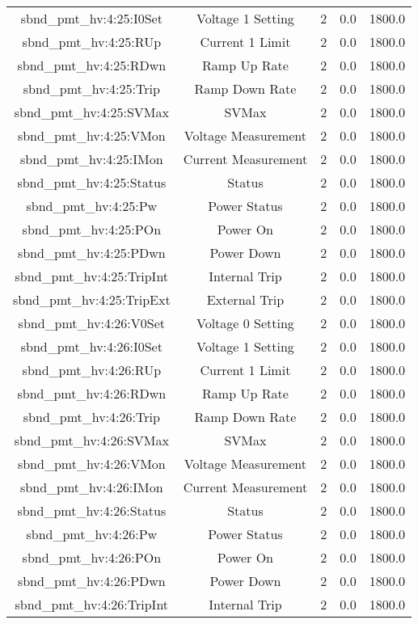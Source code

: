 \begin{table}[ptb]
\begin{tabular}{c | c c c c}
sbnd_pmt_hv:4:25:I0Set & Voltage 1 Setting & 2 & 0.0 & 1800.0\\ 
sbnd_pmt_hv:4:25:RUp & Current 1 Limit & 2 & 0.0 & 1800.0\\ 
sbnd_pmt_hv:4:25:RDwn & Ramp Up Rate & 2 & 0.0 & 1800.0\\ 
sbnd_pmt_hv:4:25:Trip & Ramp Down Rate & 2 & 0.0 & 1800.0\\ 
sbnd_pmt_hv:4:25:SVMax & SVMax & 2 & 0.0 & 1800.0\\ 
sbnd_pmt_hv:4:25:VMon & Voltage Measurement & 2 & 0.0 & 1800.0\\ 
sbnd_pmt_hv:4:25:IMon & Current Measurement & 2 & 0.0 & 1800.0\\ 
sbnd_pmt_hv:4:25:Status & Status & 2 & 0.0 & 1800.0\\ 
sbnd_pmt_hv:4:25:Pw & Power Status & 2 & 0.0 & 1800.0\\ 
sbnd_pmt_hv:4:25:POn & Power On & 2 & 0.0 & 1800.0\\ 
sbnd_pmt_hv:4:25:PDwn & Power Down & 2 & 0.0 & 1800.0\\ 
sbnd_pmt_hv:4:25:TripInt & Internal Trip & 2 & 0.0 & 1800.0\\ 
sbnd_pmt_hv:4:25:TripExt & External Trip & 2 & 0.0 & 1800.0\\ 
sbnd_pmt_hv:4:26:V0Set & Voltage 0 Setting & 2 & 0.0 & 1800.0\\ 
sbnd_pmt_hv:4:26:I0Set & Voltage 1 Setting & 2 & 0.0 & 1800.0\\ 
sbnd_pmt_hv:4:26:RUp & Current 1 Limit & 2 & 0.0 & 1800.0\\ 
sbnd_pmt_hv:4:26:RDwn & Ramp Up Rate & 2 & 0.0 & 1800.0\\ 
sbnd_pmt_hv:4:26:Trip & Ramp Down Rate & 2 & 0.0 & 1800.0\\ 
sbnd_pmt_hv:4:26:SVMax & SVMax & 2 & 0.0 & 1800.0\\ 
sbnd_pmt_hv:4:26:VMon & Voltage Measurement & 2 & 0.0 & 1800.0\\ 
sbnd_pmt_hv:4:26:IMon & Current Measurement & 2 & 0.0 & 1800.0\\ 
sbnd_pmt_hv:4:26:Status & Status & 2 & 0.0 & 1800.0\\ 
sbnd_pmt_hv:4:26:Pw & Power Status & 2 & 0.0 & 1800.0\\ 
sbnd_pmt_hv:4:26:POn & Power On & 2 & 0.0 & 1800.0\\ 
sbnd_pmt_hv:4:26:PDwn & Power Down & 2 & 0.0 & 1800.0\\ 
sbnd_pmt_hv:4:26:TripInt & Internal Trip & 2 & 0.0 & 1800.0\\ 

\end{tabular}
\end{table}
